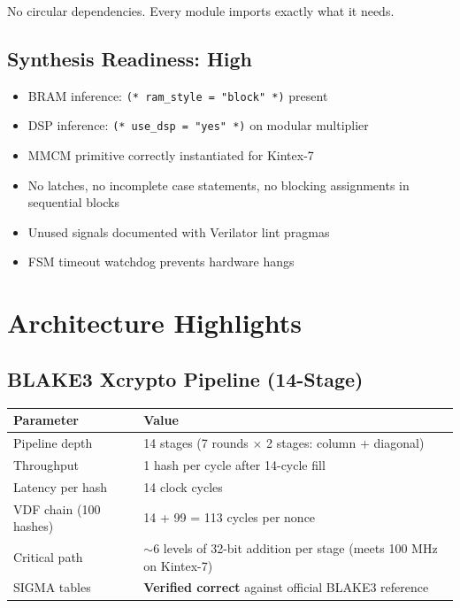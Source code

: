 \documentclass[11pt,a4paper]{article}
\begin{document}
No circular dependencies. Every module imports exactly what it needs.

\subsection{Synthesis Readiness: High}

\begin{itemize}[leftmargin=1.5em, itemsep=2pt]
    \item BRAM inference: \texttt{(* ram\_style = "block" *)} present
    \item DSP inference: \texttt{(* use\_dsp = "yes" *)} on modular multiplier
    \item MMCM primitive correctly instantiated for Kintex-7
    \item No latches, no incomplete case statements, no blocking assignments in sequential blocks
    \item Unused signals documented with Verilator lint pragmas
    \item FSM timeout watchdog prevents hardware hangs
\end{itemize}

\section{Architecture Highlights}

\subsection{BLAKE3 Xcrypto Pipeline (14-Stage)}

\begin{center}
\begin{tabular}{@{}lp{9cm}@{}}
\toprule
\textbf{Parameter} & \textbf{Value} \\
\midrule
Pipeline depth & 14 stages (7 rounds $\times$ 2 stages: column + diagonal) \\
Throughput & 1 hash per cycle after 14-cycle fill \\
Latency per hash & 14 clock cycles \\
VDF chain (100 hashes) & 14 + 99 = 113 cycles per nonce \\
Critical path & $\sim$6 levels of 32-bit addition per stage (meets 100 MHz on Kintex-7) \\
SIGMA tables & \textbf{Verified correct} against official BLAKE3 reference \\
\bottomrule
\end{tabular}
\end{center}
\end{document}
